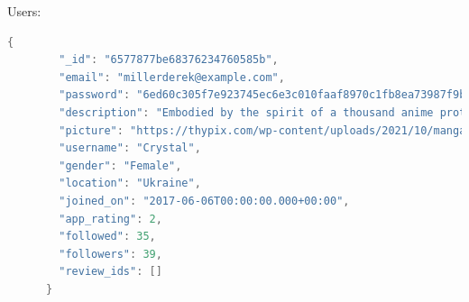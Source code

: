 Users:
\begin{mdframed}[backgroundcolor=yellow!20, innerleftmargin=10pt, innerrightmargin=10pt]
    \begin{lstlisting}[language=java]
      {
        "_id": "6577877be68376234760585b",
        "email": "millerderek@example.com",
        "password": "6ed60c305f7e923745ec6e3c010faaf8970c1fb8ea73987f9bf6d5ed053aa94c",
        "description": "Embodied by the spirit of a thousand anime protagonists.",
        "picture": "https://thypix.com/wp-content/uploads/2021/10/manga-profile-picture-82...",
        "username": "Crystal",
        "gender": "Female",
        "location": "Ukraine",
        "joined_on": "2017-06-06T00:00:00.000+00:00",
        "app_rating": 2,
        "followed": 35,
        "followers": 39,
        "review_ids": []
      }
      
    \end{lstlisting}
\end{mdframed}

\newpage

